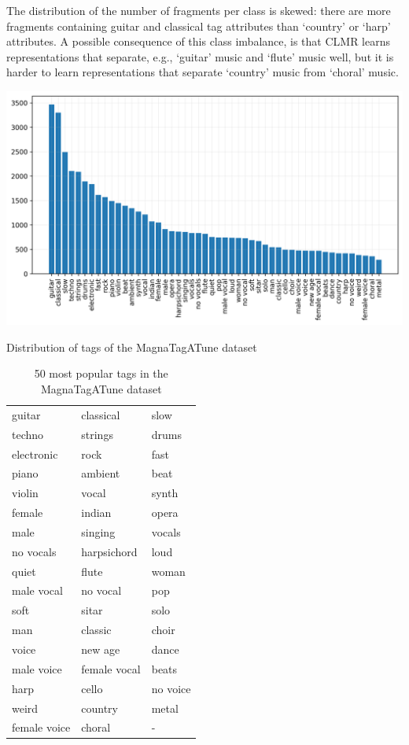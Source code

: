 The distribution of the number of fragments per class is skewed: there are more fragments containing guitar and classical tag attributes than `country' or `harp' attributes. A possible consequence of this class imbalance, is that CLMR learns representations that separate, e.g., `guitar' music and `flute' music well, but it is harder to learn representations that separate `country' music from `choral' music.


\begin{marginfigure}
    \centering
    \includegraphics[width=\columnwidth]{figs/tag_stats_magnatagatune.png}
    \caption{Distribution of tags of the MagnaTagATune dataset}
    \label{fig:tag_stats_magnatagatune}
\end{marginfigure}


\begin{table}[t]
    \centering
    \begin{tabular}{lll}\toprule
        guitar  & classical & slow \\
        techno & strings & drums \\
        electronic & rock & fast \\
        piano & ambient & beat \\
        violin & vocal & synth \\
        female & indian & opera \\
        male & singing & vocals \\
        no vocals & harpsichord & loud \\
        quiet & flute & woman \\
        male vocal & no vocal & pop \\
        soft & sitar & solo \\
        man & classic & choir \\
        voice & new age & dance \\
        male voice & female vocal & beats \\
        harp & cello & no voice \\
        weird & country & metal \\
        female voice & choral & - \\                 
        \bottomrule
    \end{tabular}
    \caption{50 most popular tags in the MagnaTagATune dataset}
    \label{tab:magnatagatune_tags}
\end{table}



